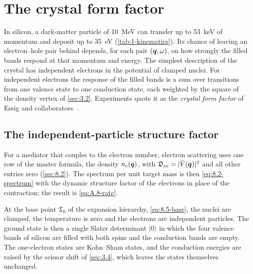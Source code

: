 \section{The crystal form factor}\label{sec:10.1}

In silicon, a dark-matter particle of \SI{10}{MeV} can transfer up to \SI{53}{keV} of momentum and deposit up to \SI{35}{eV} (\cref{tab:1-kinematics}). Its chance of leaving an electron--hole pair behind depends, for each pair $(\bm{q},\omega)$, on how strongly the filled bands respond at that momentum and energy. The simplest description of the crystal has independent electrons in the potential of clamped nuclei. For independent electrons the response of the filled bands is a sum over transitions from one valence state to one conduction state, each weighted by the square of the density vertex of \cref{sec:3.2}. Experiments quote it as the \emph{crystal form factor} of Essig and collaborators~\cite{essig2016direct}.

\subsection{The independent-particle structure factor}

For a mediator that couples to the electron number, electron scattering uses one row of the master formula, the density $n_e(\bm{q})$, with $\mathfrak{D}_{ee} = |\tilde V(\bm{q})|^2$ and all other entries zero (\cref{sec:8.2}). The spectrum per unit target mass is then \cref{eq:8.2-spectrum} with the dynamic structure factor of the electrons in place of the contraction; the result is \cref{eq:A.8-rate}.

At the base point $\mathfrak{T}_0$ of the expansion hierarchy, \cref{eq:8.5-base}, the nuclei are clamped, the temperature is zero and the electrons are independent particles. The ground state is then a single Slater determinant $|0\rangle$ in which the four valence bands of silicon are filled with both spins and the conduction bands are empty. The one-electron states are Kohn--Sham states, and the conduction energies are raised by the scissor shift of \cref{sec:3.4}, which leaves the states themselves unchanged.

